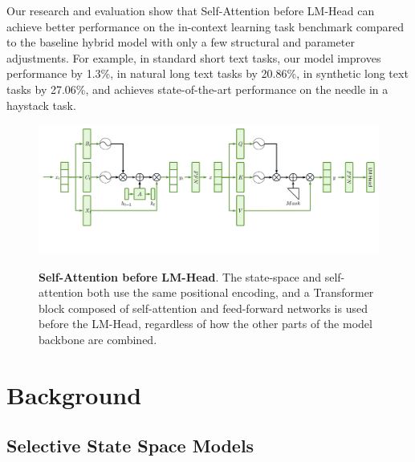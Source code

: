\documentclass{article}
\theoremstyle{plain}
\theoremstyle{definition}
\theoremstyle{remark}
\begin{document}
Our research and evaluation show that Self-Attention before LM-Head can achieve better performance on the in-context learning task benchmark compared to the baseline hybrid model with only a few structural and parameter adjustments. For example, in standard short text tasks, our model improves performance by 1.3\%, in natural long text tasks by 20.86\%, in synthetic long text tasks by 27.06\%, and achieves state-of-the-art performance on the needle in a haystack task.

\begin{figure}[ht]
   \centering
   \includegraphics[width=\linewidth]{fig/architecture.pdf}
   \caption{
     \textbf{Self-Attention before LM-Head}.
      The state-space and self-attention both use the same positional encoding, and a Transformer block composed of self-attention and feed-forward networks is used before the LM-Head, regardless of how the other parts of the model backbone are combined.
      }
      \textbf{}


   \label{fig:architecture}
\end{figure}


\section{Background}
\subsection{Selective State Space Models}
\end{document}
